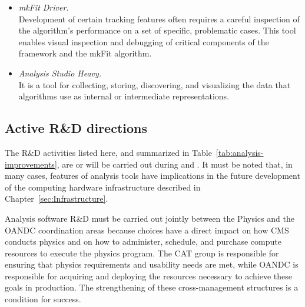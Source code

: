 \begin{itemize}
\item {\em mkFit Driver.} \\
Development of certain tracking features often requires a careful inspection of the algorithm's performance on a set of specific, problematic cases. This tool enables visual inspection and debugging of critical components of the framework and the mkFit algorithm.

\item {\em Analysis Studio Heavy.} \\
It is a tool for collecting, storing, discovering, and visualizing the data that algorithms use as internal or intermediate representations. %
\end{itemize}

\subsection{Active R\&D directions}

The R\&D activities listed here, and summarized in Table~\ref{tab:analysis-improvements}, are or will be carried out during \RunThree and \LSThree. It must be noted that, in many cases, features of analysis tools have implications in the future development of the computing hardware infrastructure described in Chapter~\ref{sec:Infrastructure}.

Analysis software R\&D must be carried out jointly between the Physics and the \gls{OANDC} coordination areas because choices have a direct impact on how CMS conducts physics and on how to administer, schedule, and purchase compute resources to execute the physics program.  The \gls{CAT} group is responsible for ensuring that physics requirements and usability needs are met, while \gls{OANDC} is responsible for acquiring and deploying the resources necessary to achieve these goals in production. The strengthening of these cross-management structures is a condition for success.

